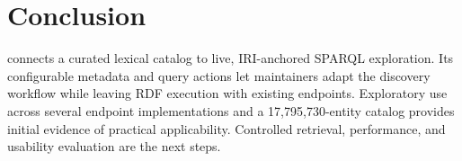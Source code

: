 \section{Conclusion}
\tp{} connects a curated lexical catalog to live, IRI-anchored SPARQL exploration. Its configurable metadata and query actions let maintainers adapt the discovery workflow while leaving RDF execution with existing endpoints. Exploratory use across several endpoint implementations and a 17,795,730-entity catalog provides initial evidence of practical applicability. Controlled retrieval, performance, and usability evaluation are the next steps.
